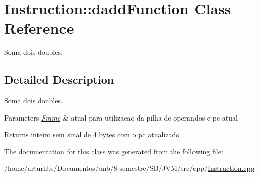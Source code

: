 \hypertarget{classInstruction_1_1daddFunction}{}\section{Instruction\+:\+:dadd\+Function Class Reference}
\label{classInstruction_1_1daddFunction}


Soma dois doubles.  




\subsection{Detailed Description}
Soma dois doubles. 


\begin{DoxyParams}{Parameters}
{\em \hyperlink{classFrame}{Frame}} & atual para utilizacao da pilha de operandos e pc atual \\
\hline
\end{DoxyParams}
\begin{DoxyReturn}{Returns}
inteiro sem sinal de 4 bytes com o pc atualizado 
\end{DoxyReturn}


The documentation for this class was generated from the following file\+:\begin{DoxyCompactItemize}
\item 
/home/arturhbs/\+Documentos/unb/8 semestre/\+S\+B/\+J\+V\+M/src/cpp/\hyperlink{Instruction_8cpp}{Instruction.\+cpp}\end{DoxyCompactItemize}
